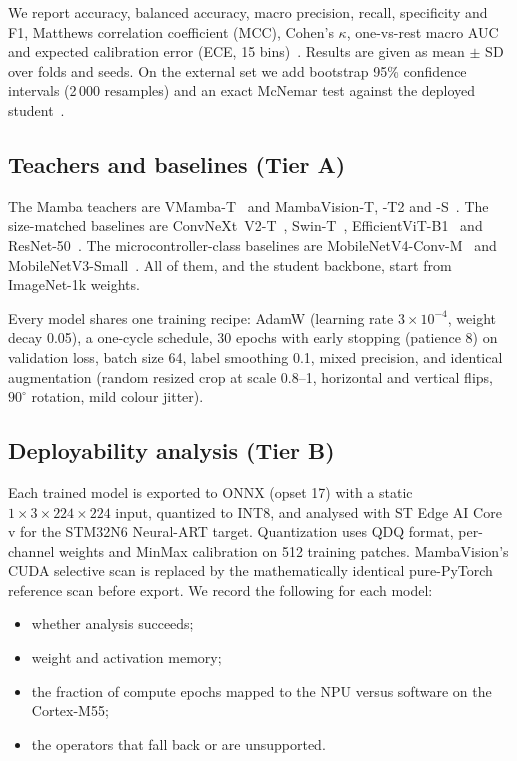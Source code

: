 \documentclass[preprint,12pt]{elsarticle}
\begin{document}
We report accuracy, balanced accuracy, macro precision, recall, specificity and F1, Matthews correlation coefficient (MCC), Cohen's $\kappa$, one-vs-rest macro AUC and expected calibration error (ECE, 15 bins)~\cite{guo2017calibration}. Results are given as mean $\pm$ SD over folds and seeds. On the external set we add bootstrap 95\% confidence intervals (2\,000 resamples) and an exact McNemar test against the deployed student~\cite{dietterich1998}.

\subsection{Teachers and baselines (Tier A)}
The Mamba teachers are VMamba-T~\cite{liu2024vmamba} and MambaVision-T, -T2 and -S~\cite{hatamizadeh2025mambavision}. The size-matched baselines are ConvNeXt~V2-T~\cite{woo2023convnextv2}, Swin-T~\cite{liu2021swin}, EfficientViT-B1~\cite{cai2023efficientvit} and ResNet-50~\cite{he2016resnet}. The microcontroller-class baselines are MobileNetV4-Conv-M~\cite{qin2024mobilenetv4} and MobileNetV3-Small~\cite{howard2019mobilenetv3}. All of them, and the student backbone, start from ImageNet-1k weights.

Every model shares one training recipe: AdamW (learning rate $3\times10^{-4}$, weight decay 0.05), a one-cycle schedule, 30 epochs with early stopping (patience 8) on validation loss, batch size 64, label smoothing 0.1, mixed precision, and identical augmentation (random resized crop at scale 0.8--1, horizontal and vertical flips, $90^\circ$ rotation, mild colour jitter).

\subsection{Deployability analysis (Tier B)}
Each trained model is exported to ONNX (opset 17) with a static $1\times3\times224\times224$ input, quantized to INT8, and analysed with ST Edge AI Core v\resSTVersion{} for the STM32N6 Neural-ART target. Quantization uses QDQ format, per-channel weights and MinMax calibration on 512 training patches. MambaVision's CUDA selective scan is replaced by the mathematically identical pure-PyTorch reference scan before export. We record the following for each model:
\begin{itemize}
\item whether analysis succeeds;
\item weight and activation memory;
\item the fraction of compute epochs mapped to the NPU versus software on the Cortex-M55;
\item the operators that fall back or are unsupported.
\end{itemize}
\end{document}
